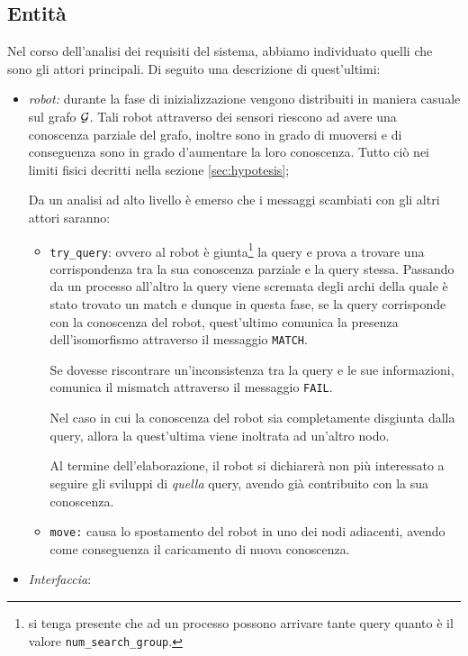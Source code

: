 \documentclass{llncs}
\begin{document}
\subsection{Entità}
Nel corso dell'analisi dei requisiti del sistema, abbiamo individuato quelli che sono
gli attori principali. Di seguito una descrizione di quest'ultimi:
\begin{itemize}
	\item \emph{robot:} durante la fase di inizializzazione
	vengono distribuiti in maniera casuale sul grafo $\mathcal{G}$. Tali robot
	attraverso dei sensori riescono ad avere una conoscenza parziale
	del grafo, inoltre sono in grado di muoversi e di conseguenza
	sono in grado d'aumentare la loro conoscenza. Tutto ciò nei limiti
	fisici decritti nella sezione \ref{sec:hypotesis};
	
	Da un analisi ad alto livello è emerso che i messaggi scambiati con
	gli altri attori saranno:
	\begin{itemize}
		\item \texttt{try\_query}: ovvero al robot è giunta\footnote{si
		tenga presente che ad un processo possono arrivare tante query
		quanto è il valore \texttt{num\_search\_group}.} la query e prova
		a trovare una corrispondenza tra la sua conoscenza parziale e
		la query stessa. Passando da un processo all'altro la query
		viene scremata degli archi della quale è stato trovato un match
		e dunque in questa fase, se la query corrisponde con la conoscenza
		del robot, quest'ultimo comunica la presenza dell'isomorfismo attraverso
		il messaggio \texttt{MATCH}.
		
		Se dovesse riscontrare un'inconsistenza tra la query e
		le sue informazioni, comunica il mismatch attraverso
		il messaggio \texttt{FAIL}.
		
		Nel caso in cui la conoscenza del robot sia completamente disgiunta
		dalla query, allora la quest'ultima viene inoltrata ad un'altro nodo.
		
		Al termine dell'elaborazione, il robot si dichiarerà non più interessato
		a seguire gli sviluppi di \emph{quella} query, avendo già contribuito con la
		sua conoscenza.
		\item \texttt{move:} causa lo spostamento del robot in uno dei
		nodi adiacenti, avendo come conseguenza il caricamento
		di nuova conoscenza.
	\end{itemize}
	\item \emph{Interfaccia}:
\end{itemize}
\end{document}
